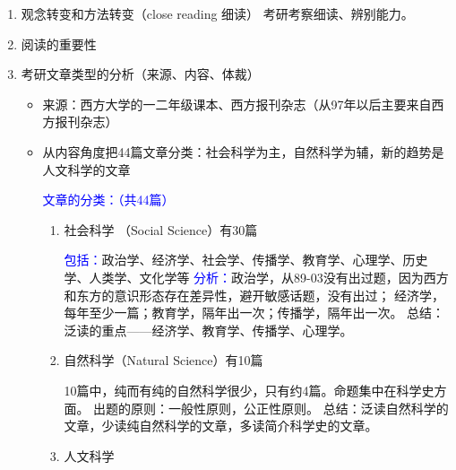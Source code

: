 \documentclass[11pt,twoside,openany,x11names,svgnames]{memoir}
\newcommand{\hei}{\CJKfamily{hei}}      %
\begin{document}
\begin{enumerate}
\item 观念转变和方法转变（close reading 细读）
     考研考察细读、辨别能力。
\item 阅读的重要性
\item 考研文章类型的分析（来源、内容、体裁）
\begin{itemize}
  \item 来源：西方大学的一二年级课本、西方报刊杂志（从97年以后主要来自西方报刊杂志）
  \item 从内容角度把44篇文章分类：社会科学为主，自然科学为辅，新的趋势是人文科学的文章

\textcolor{blue}{文章的分类：（共44篇）}
\begin{enumerate}[(3)]
  \item 社会科学 （Social Science）有30篇

\textcolor{blue}{包括：}政治学、经济学、社会学、传播学、教育学、心理学、历史学、人类学、文化学等
\textcolor{blue}{分析：}政治学，从89-03没有出过题，因为西方和东方的意识形态存在差异性，避开敏感话题，没有出过；
   经济学，每年至少一篇；教育学，隔年出一次；传播学，隔年出一次。
总结：泛读的重点——经济学、教育学、传播学、心理学。
  \item 自然科学（Natural Science）有10篇

10篇中，纯而有纯的自然科学很少，只有约4篇。命题集中在科学史方面。
出题的原则：一般性原则，公正性原则。
   {\hei 总结}：泛读自然科学的文章，少读纯自然科学的文章，多读简介科学史的文章。
  \item 人文科学


\end{enumerate}
\end{itemize}
\end{enumerate}
\end{document}
